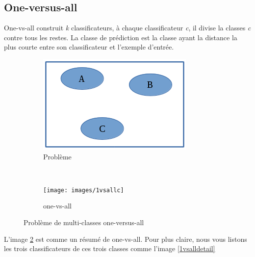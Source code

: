 \subsection{One-versus-all}
One-vs-all construit \textit{k} classificateurs, à chaque classificateur \textit{c}, il divise la classes \textit{c} contre tous les restes. La classe de prédiction est la classe ayant la distance la plus courte entre son classificateur et l'exemple d'entrée.

\begin{figure}[H]
        \centering
        \begin{subfigure}[b]{0.5\textwidth}
                \includegraphics[width=\textwidth]{images/multiclass}
                \caption{Problème}
                \label{mclass}
        \end{subfigure}%
        ~ %
        \begin{subfigure}[b]{0.5\textwidth}
                \texttt{[image: images/1vsallc]}
                \caption{one-vs-all}
                \label{1vsall}
        \end{subfigure}
        \caption{Problème de multi-classes one-versus-all}\label{mulclass}
\end{figure}


L'image \ref{1vsall} est comme un résumé de one-vs-all. Pour plus claire, nous vous listons les trois classificateurs de ces trois classes comme l'image \ref{1vsalldetail}

